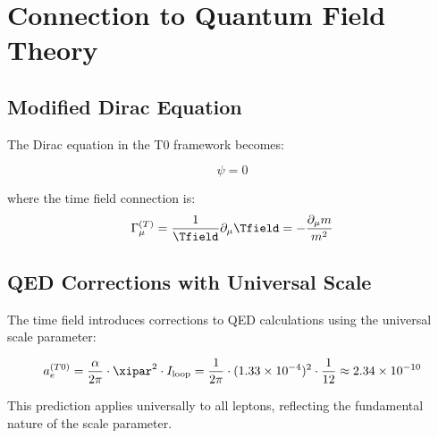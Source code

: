 	\section{Connection to Quantum Field Theory}
	\label{sec:qft_connection}
	
	\subsection{Modified Dirac Equation}
	\label{subsec:modified_dirac}
	
	The Dirac equation in the T0 framework becomes:
	
	\begin{equation}
		[i\gamma^{\mu}(\partial_{\mu} + \Gamma_{\mu}^{(T)}) - m(x,t)]\psi = 0
		\label{eq:t0_dirac}
	\end{equation}
	
	where the time field connection is:
	\begin{equation}
		\Gamma_{\mu}^{(T)} = \frac{1}{\Tfield} \partial_{\mu} \Tfield = -\frac{\partial_{\mu} m}{m^2}
		\label{eq:time_field_connection}
	\end{equation}
	
	\subsection{QED Corrections with Universal Scale}
	\label{subsec:qed_corrections_universal}
	
	The time field introduces corrections to QED calculations using the universal scale parameter:
	
	\begin{equation}
		a_e^{(T0)} = \frac{\alpha}{2\pi} \cdot \xipar^2 \cdot I_{\text{loop}} = \frac{1}{2\pi} \cdot (1.33 \times 10^{-4})^2 \cdot \frac{1}{12} \approx 2.34 \times 10^{-10}
		\label{eq:anomalous_moment_correction}
	\end{equation}
	
	This prediction applies universally to all leptons, reflecting the fundamental nature of the scale parameter.
